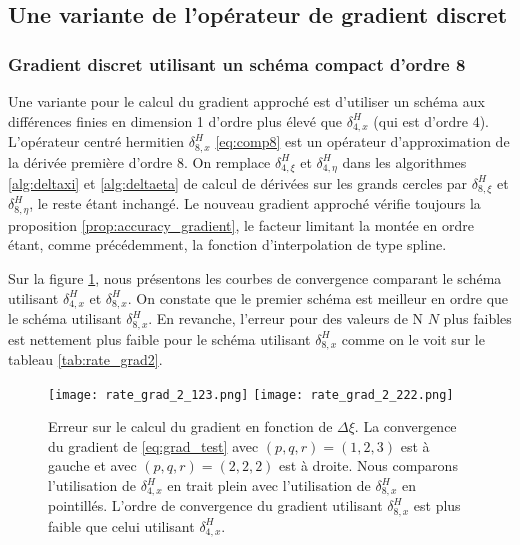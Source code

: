 \subsection{Une variante de l'opérateur de gradient discret}


\subsubsection{Gradient discret utilisant un schéma compact d'ordre 8}

Une variante pour le calcul du gradient approché est d'utiliser un schéma aux différences finies en dimension 1 d'ordre plus élevé que $\delta_{4,x}^H$ (qui est d'ordre 4). 
L'opérateur centré hermitien $\delta_{8,x}^H$ \eqref{eq:comp8} est un opérateur d'approximation de la dérivée première d'ordre $8$.
On remplace $\delta_{4, \xi}^H$ et $\delta_{4, \eta}^H$ dans les algorithmes \ref{alg:deltaxi} et \ref{alg:deltaeta} de calcul de dérivées sur les grands cercles par $\delta_{8, \xi}^H$ et $\delta_{8, \eta}^H$, le reste étant inchangé. Le nouveau gradient approché vérifie toujours la proposition \ref{prop:accuracy_gradient}, le facteur limitant la montée en ordre étant, comme précédemment, la fonction d'interpolation de type spline.

Sur la figure \ref{fig:rate_grad2}, nous présentons les courbes de convergence comparant le schéma utilisant $\delta^H_{4,x}$ et $\delta^H_{8,x}$. On constate que le premier schéma est meilleur en ordre que le schéma utilisant $\delta^H_{8,x}$. En revanche, l'erreur pour des valeurs de N $N$ plus faibles est nettement plus faible pour le schéma utilisant $\delta^H_{8,x}$ comme on le voit sur le tableau \ref{tab:rate_grad2}.

\begin{figure}[htbp]
\begin{center}
\texttt{[image: rate\_grad\_2\_123.png]}
\texttt{[image: rate\_grad\_2\_222.png]}
\end{center}
\caption{Erreur sur le calcul du gradient en fonction de $\Delta \xi$. La convergence du gradient de \eqref{eq:grad_test} avec $(p,q,r)=(1,2,3)$ est à gauche et avec $(p,q,r)=(2,2,2)$ est à droite. Nous comparons l'utilisation de $\delta^H_{4,x}$ en trait plein avec l'utilisation de $\delta^H_{8,x}$ en pointillés. L'ordre de convergence du gradient utilisant $\delta^H_{8,x}$ est plus faible que celui utilisant $\delta^H_{4,x}$.}
\label{fig:rate_grad2}
\end{figure}


